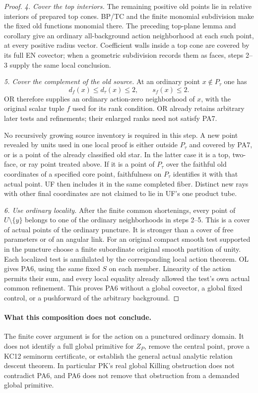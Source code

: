 \begin{proof}
\emph{4. Cover the top interiors.}
The remaining positive old points lie in relative interiors of
prepared top cones.  BP/TC and the finite monomial subdivision
make the fixed old functions monomial there.  The preceding
top-plane lemma and corollary give an ordinary all-background
action neighborhood at each such point, at every positive
radius vector.  Coefficient walls inside a top cone are covered
by its full EN covector; when a geometric subdivision records
them as faces, steps 2--3 supply the same local conclusion.

\emph{5. Cover the complement of the old source.}
At an ordinary point $x\notin P_\tau$ one has
\[
                     d_f(x)\le d_\tau(x)\le2,
                  \qquad s_f(x)\le2.
 \tag{PA7}
\]
OR therefore supplies an ordinary action-zero neighborhood of
$x$, with the original scalar tuple $f$ used for its rank
condition.  OR already retains arbitrary later tests and
refinements; their enlarged ranks need not satisfy PA7.

No recursively growing source inventory is required in this
step.  A new point revealed by units used in one local proof
is either outside $P_\tau$ and covered by PA7, or is a point
of the already classified old star.  In the latter case it
is a top, two-face, or ray point treated above.  If it is a
point of $P_\tau$ over the faithful old coordinates of a
specified core point, faithfulness on $P_\tau$ identifies it
with that actual point.  UF then includes it in the same
completed fiber.  Distinct new rays with other final coordinates
are not claimed to lie in UF's one product tube.

\emph{6. Use ordinary locality.}
After the finite common shortenings, every point of
$U\setminus\{y\}$ belongs to one of the ordinary neighborhoods
in steps 2--5.  This is a cover of actual points of the ordinary
puncture.  It is stronger than a cover of free parameters or of
an angular link.  For an original compact smooth test supported
in the puncture choose a finite subordinate original smooth
partition of unity.  Each localized test is annihilated by the
corresponding local action theorem.  OL gives PA6, using the
same fixed $S$ on each member.  Linearity of the action permits
their sum, and every local equality already allowed the
test's own actual common refinement.  This proves PA6 without
a global covector, a global fixed control, or a pushforward of
the arbitrary background.
\end{proof}

\paragraph{What this composition does not conclude.}
The finite cover argument is for the action on a punctured
ordinary domain.  It does not identify a full global primitive
for $Z_P$, remove the central point, prove a KC12 seminorm
certificate, or establish the general actual analytic relation
descent theorem.  In particular PK's real global Killing
obstruction does not contradict PA6, and PA6 does not remove
that obstruction from a demanded global primitive.


